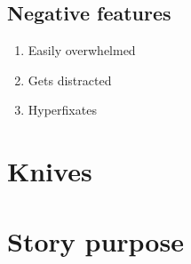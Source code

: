 \documentclass[11pt]{article}
\begin{document}
\subsection{Negative features}
\begin{enumerate}
    \item Easily overwhelmed 
    \item Gets distracted
    \item Hyperfixates 
\end{enumerate}

\section{Knives}



\section{Story purpose}
\end{document}
